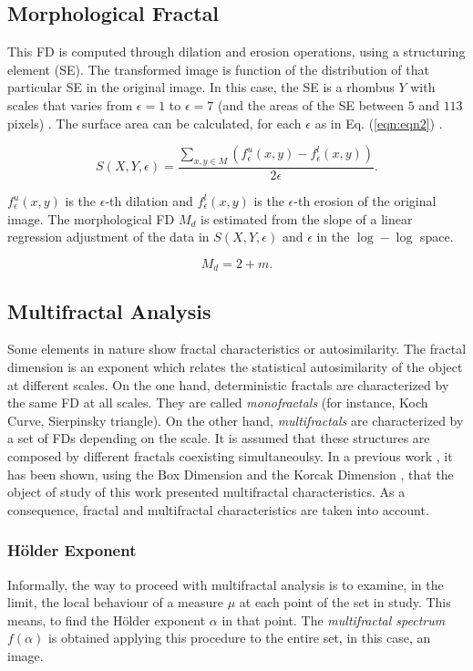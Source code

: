 \documentclass[oneside,a4paper,english,links]{amca}
\begin{document}
\subsection{Morphological Fractal}
This FD is computed through dilation and erosion operations, using a structuring element (SE). The transformed image is function of the distribution of that particular SE in the original image.  In this case, the SE is a rhombus $Y$ with scales that varies from $\epsilon = 1$ to $\epsilon = 7$ (and the areas of the SE between $5$ and $113$ pixels)  . The surface area can be calculated, for each $\epsilon$ as in Eq. (\ref{eqn:eqn2}) \cite{Gonzales2008}.

\begin{equation}
S(X,Y,\epsilon) = \frac{\sum_{x,y \in M} (f_{\epsilon}^{u}(x,y) - f_{\epsilon}^{l}(x,y))}{2\epsilon}.
\label{eqn:eqn2}
\end{equation}

$f_{\epsilon}^{u}(x,y)$ is the $\epsilon$-th dilation and $f_{\epsilon}^{l}(x,y)$ is the $\epsilon$-th erosion of the original image. The morphological FD $M_{d}$ is estimated from the slope of a linear regression adjustment of the data in $S(X,Y,\epsilon)$ and $\epsilon$ in the $\log-\log$ space.

\begin{equation}
M_{d} = 2 + m.
\label{eqn:eqn3}
\end{equation}

\subsection{Multifractal Analysis}
Some elements in nature show fractal characteristics or autosimilarity. The fractal dimension is an exponent which relates the statistical autosimilarity of the object at different scales. On the one hand, deterministic fractals are characterized by the same FD at all scales. They are called {\em monofractals} (for instance, Koch Curve, Sierpinsky triangle). On the other hand, {\em multifractals} \cite{Mandelbrot89} are characterized by a set of FDs depending on the scale. It is assumed that these structures are composed by different fractals coexisting simultaneoulsy. In a previous work \cite{Baravalle2012}, it has been shown, using the Box Dimension and the Korcak Dimension \cite{Imre11}, that the object of study of this work presented multifractal characteristics. As a consequence, fractal and multifractal characteristics are taken into account.

\subsubsection*{H\"older Exponent}
Informally, the way to proceed with multifractal analysis is to examine, in the limit, the local behaviour of a measure $\mu$ at each point of the set in study. This means, to find the H\"older exponent $\alpha$ in that point. The {\em multifractal spectrum} $f(\alpha)$ is obtained applying this procedure to the entire set, in this case, an image.
\end{document}

